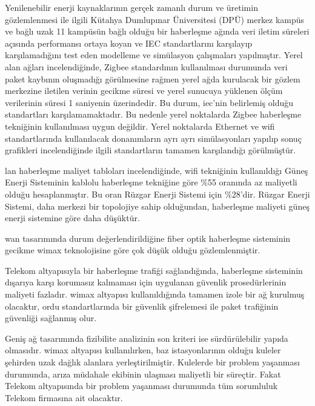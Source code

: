Yenilenebilir enerji kaynaklarının gerçek zamanlı durum ve üretimin gözlemlenmesi ile ilgili Kütahya Dumlupınar Üniversitesi (DPÜ) merkez kampüs ve bağlı uzak 11 kampüsün bağlı olduğu bir haberleşme ağında veri iletim süreleri açısında performansı ortaya koyan ve IEC standartlarını karşılayıp karşılamadığını test eden modelleme ve simülasyon çalışmaları yapılmıştır. Yerel alan ağları incelendiğinde, Zigbee standardının kullanılması durumunda veri paket kaybının oluşmadığı görülmesine rağmen yerel ağda kurulacak bir gözlem merkezine iletilen verinin gecikme süresi ve yerel sunucuya yüklenen ölçüm verilerinin süresi 1 saniyenin üzerindedir. Bu durum, \gls{iec}'nin belirlemiş olduğu standartları karşılamamaktadır. Bu nedenle yerel noktalarda Zigbee haberleşme tekniğinin kullanılması uygun değildir. Yerel noktalarda Ethernet ve \gls{wifi} standartlarında kullanılacak donanımların ayrı ayrı simülasyonları yapılıp sonuç grafikleri incelendiğinde ilgili standartların tamamen karşılandığı görülmüştür. 

\gls{lan} haberleşme maliyet tabloları incelendiğinde, \gls{wifi} tekniğinin kullanıldığı Güneş Enerji Sisteminin kablolu haberleşme tekniğine göre \%55 oranında az maliyetli olduğu hesaplanmıştır. Bu oran Rüzgar Enerji Sistemi için \%28’dir. Rüzgar Enerji Sistemi, daha merkezi bir topolojiye sahip olduğundan, haberleşme maliyeti güneş enerji sistemine göre daha düşüktür.

\gls{wan} tasarımında durum değerlendirildiğine fiber optik haberleşme sisteminin gecikme \gls{wimax} teknolojisine göre çok düşük olduğu gözlemlenmiştir. 

Telekom altyapısıyla bir haberleşme trafiği sağlandığında, haberleşme sisteminin dışarıya karşı korumasız kalmaması için uygulanan güvenlik prosedürlerinin maliyeti fazladır. \gls{wimax} altyapısı kullanıldığında tamamen izole bir ağ kurulmuş olacaktır, ordu standartlarında bir güvenlik şifrelemesi ile paket trafiğinin güvenliği sağlanmış olur.

Geniş ağ tasarımında fizibilite analizinin son kriteri ise sürdürülebilir yapıda olmasıdır. \gls{wimax} altyapısı kullanılırken, baz istasyonlarının olduğu kuleler şehirden uzak dağlık alanlara yerleştirilmiştir. Kulelerde bir problem yaşanması durumunda, arıza müdahale ekibinin ulaşması maliyetli bir süreçtir. Fakat Telekom altyapısında bir problem yaşanması durumunda tüm sorumluluk Telekom firmasına ait olacaktır. 



